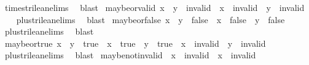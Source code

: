 \begin{isabellebody}
\ times{\isacharunderscore}trilean{\isachardot}elims\ \isamarkupfalse%
\ blast%
\endisatagproof
{\isafoldproof}%
%
\isadelimproof
\isanewline
%
\endisadelimproof
\isanewline
{}\isamarkupfalse%
\ maybe{\isacharunderscore}or{\isacharunderscore}valid{\isacharcolon}\ {\isachardoublequoteopen}x\ {\isasymor}\isactrlsub {\isacharquery}\ y\ {\isasymnoteq}\ invalid\ {\isasymLongrightarrow}\ x\ {\isasymnoteq}\ invalid\ {\isasymand}\ y\ {\isasymnoteq}\ invalid{\isachardoublequoteclose}\isanewline
%
\isadelimproof
\ \ %
\endisadelimproof
%
\isatagproof
{}\isamarkupfalse%
\ plus{\isacharunderscore}trilean{\isachardot}elims\ \isamarkupfalse%
\ blast%
\endisatagproof
{\isafoldproof}%
%
\isadelimproof
\isanewline
%
\endisadelimproof
\isanewline
{}\isamarkupfalse%
\ maybe{\isacharunderscore}or{\isacharunderscore}false{\isacharcolon}\ {\isachardoublequoteopen}{\isacharparenleft}x\ {\isasymor}\isactrlsub {\isacharquery}\ y\ {\isacharequal}\ false{\isacharparenright}\ {\isacharequal}\ {\isacharparenleft}x\ {\isacharequal}\ false\ {\isasymand}\ y\ {\isacharequal}\ false{\isacharparenright}{\isachardoublequoteclose}\isanewline
%
\isadelimproof
\ \ %
\endisadelimproof
%
\isatagproof
{}\isamarkupfalse%
\ plus{\isacharunderscore}trilean{\isachardot}elims\ \isamarkupfalse%
\ blast%
\endisatagproof
{\isafoldproof}%
%
\isadelimproof
\isanewline
%
\endisadelimproof
\isanewline
{}\isamarkupfalse%
\ maybe{\isacharunderscore}or{\isacharunderscore}true{\isacharcolon}\ {\isachardoublequoteopen}{\isacharparenleft}x\ {\isasymor}\isactrlsub {\isacharquery}\ y\ {\isacharequal}\ true{\isacharparenright}\ {\isacharequal}\ {\isacharparenleft}{\isacharparenleft}x\ {\isacharequal}\ true\ {\isasymor}\ y\ {\isacharequal}\ true{\isacharparenright}\ {\isasymand}\ x\ {\isasymnoteq}\ invalid\ {\isasymand}\ y\ {\isasymnoteq}\ invalid{\isacharparenright}{\isachardoublequoteclose}\isanewline
%
\isadelimproof
\ \ %
\endisadelimproof
%
\isatagproof
{}\isamarkupfalse%
\ plus{\isacharunderscore}trilean{\isachardot}elims\ \isamarkupfalse%
\ blast%
\endisatagproof
{\isafoldproof}%
%
\isadelimproof
\isanewline
%
\endisadelimproof
\isanewline
{}\isamarkupfalse%
\ maybe{\isacharunderscore}not{\isacharunderscore}invalid{\isacharcolon}\ {\isachardoublequoteopen}{\isacharparenleft}{\isasymnot}\isactrlsub {\isacharquery}\ x\ {\isacharequal}\ invalid{\isacharparenright}\ {\isacharequal}\ {\isacharparenleft}x\ {\isacharequal}\ invalid{\isacharparenright}{\isachardoublequoteclose}\isanewline

\end{isabellebody}
